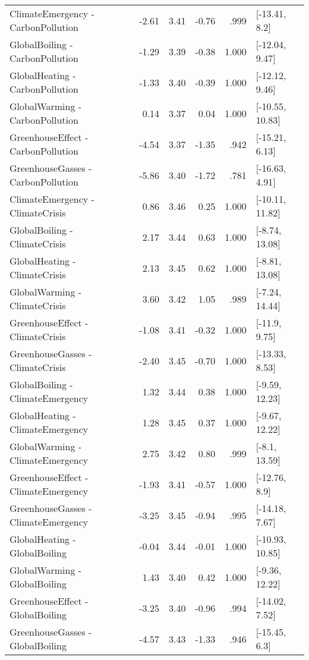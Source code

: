 \begin{table}[ht]
\begin{tabular}{lrrrrl}
  ClimateEmergency - CarbonPollution & -2.61 & 3.41 & -0.76 & .999 & [-13.41, 8.2] \\ 
  GlobalBoiling - CarbonPollution & -1.29 & 3.39 & -0.38 & 1.000 & [-12.04, 9.47] \\ 
  GlobalHeating - CarbonPollution & -1.33 & 3.40 & -0.39 & 1.000 & [-12.12, 9.46] \\ 
  GlobalWarming - CarbonPollution & 0.14 & 3.37 & 0.04 & 1.000 & [-10.55, 10.83] \\ 
  GreenhouseEffect - CarbonPollution & -4.54 & 3.37 & -1.35 & .942 & [-15.21, 6.13] \\ 
  GreenhouseGasses - CarbonPollution & -5.86 & 3.40 & -1.72 & .781 & [-16.63, 4.91] \\ 
  ClimateEmergency - ClimateCrisis & 0.86 & 3.46 & 0.25 & 1.000 & [-10.11, 11.82] \\ 
  GlobalBoiling - ClimateCrisis & 2.17 & 3.44 & 0.63 & 1.000 & [-8.74, 13.08] \\ 
  GlobalHeating - ClimateCrisis & 2.13 & 3.45 & 0.62 & 1.000 & [-8.81, 13.08] \\ 
  GlobalWarming - ClimateCrisis & 3.60 & 3.42 & 1.05 & .989 & [-7.24, 14.44] \\ 
  GreenhouseEffect - ClimateCrisis & -1.08 & 3.41 & -0.32 & 1.000 & [-11.9, 9.75] \\ 
  GreenhouseGasses - ClimateCrisis & -2.40 & 3.45 & -0.70 & 1.000 & [-13.33, 8.53] \\ 
  GlobalBoiling - ClimateEmergency & 1.32 & 3.44 & 0.38 & 1.000 & [-9.59, 12.23] \\ 
  GlobalHeating - ClimateEmergency & 1.28 & 3.45 & 0.37 & 1.000 & [-9.67, 12.22] \\ 
  GlobalWarming - ClimateEmergency & 2.75 & 3.42 & 0.80 & .999 & [-8.1, 13.59] \\ 
  GreenhouseEffect - ClimateEmergency & -1.93 & 3.41 & -0.57 & 1.000 & [-12.76, 8.9] \\ 
  GreenhouseGasses - ClimateEmergency & -3.25 & 3.45 & -0.94 & .995 & [-14.18, 7.67] \\ 
  GlobalHeating - GlobalBoiling & -0.04 & 3.44 & -0.01 & 1.000 & [-10.93, 10.85] \\ 
  GlobalWarming - GlobalBoiling & 1.43 & 3.40 & 0.42 & 1.000 & [-9.36, 12.22] \\ 
  GreenhouseEffect - GlobalBoiling & -3.25 & 3.40 & -0.96 & .994 & [-14.02, 7.52] \\ 
  GreenhouseGasses - GlobalBoiling & -4.57 & 3.43 & -1.33 & .946 & [-15.45, 6.3] \\ 

\end{tabular}
\end{table}
